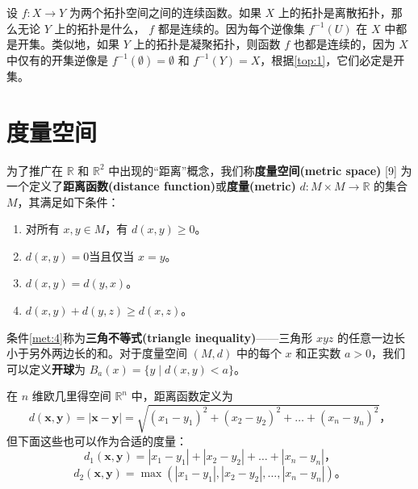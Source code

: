 \begin{eg}\label{eg:10.10}
	设 $f:X\rightarrow Y$ 为两个拓扑空间之间的连续函数。如果 $X$ 上的拓扑是离散拓扑，那么无论 $Y$ 上的拓扑是什么， $f$ 都是连续的。因为每个逆像集 $f^{-1} (U)$ 在 $X$ 中都是开集。类似地，如果 $Y$ 上的拓扑是凝聚拓扑，则函数 $f$ 也都是连续的，因为 $X$ 中仅有的开集逆像是 $f^{-1} (\emptyset )=\emptyset $ 和 $f^{-1} (Y)=X$，根据\ref{top:1}，它们必定是开集。
\end{eg}

\section{度量空间}

为了推广在 $\mathbb{R}$ 和 $\mathbb{R}^{2}$ 中出现的“距离”概念，我们称\textbf{度量空间(metric space)} [9] 为一个定义了\textbf{距离函数(distance function)}或\textbf{度量(metric)} $d:M\times M\rightarrow \mathbb{R}$ 的集合 $M$，其满足如下条件：

\begin{enumerate}[label=(Met\arabic*),ref=Met\arabic*]
	\item \label{met:1}
	对所有 $x,y\in M$，有 $d(x,y)\geq 0$。
	\item \label{met:2}
	 $d(x,y)=0$当且仅当 $x=y$。
	\item \label{met:3}
	 $d(x,y)=d(y,x)$。
	\item \label{met:4}
	 $d(x,y)+d(y,z)\geq d(x,z)$。
\end{enumerate}

条件\ref{met:4}称为\textbf{三角不等式(triangle inequality)}——三角形 $xyz$ 的任意一边长小于另外两边长的和。对于度量空间 $(M,d)$ 中的每个 $x$ 和正实数 $a >0$，我们可以定义\textbf{开球}为 $B_{a} (x)=\{y\mid d(x,y)< a\}$。

在 $n$ 维欧几里得空间 $\mathbb{R}^{n}$ 中，距离函数定义为
\begin{equation*}
    d(\mathbf{x} ,\mathbf{y} )=|\mathbf{x} -\mathbf{y} |=\sqrt{(x_{1} -y_{1} )^{2} +(x_{2} -y_{2} )^{2} +\dotsc +(x_{n} -y_{n} )^{2}} ，
\end{equation*}
但下面这些也可以作为合适的度量：
\begin{equation*}
    d_{1} (\mathbf{x} ,\mathbf{y} )=|x_{1} -y_{1} |+|x_{2} -y_{2} |+\dotsc +|x_{n} -y_{n} |，
\end{equation*}
\begin{equation*}
    d_{2} (\mathbf{x} ,\mathbf{y} )=\max (|x_{1} -y_{1} |,|x_{2} -y_{2} |,\dotsc ,|x_{n} -y_{n} |)。
\end{equation*}

